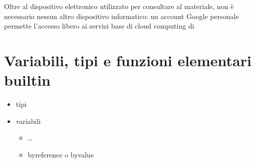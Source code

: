\documentclass[letterpaper,10pt,italian]{jupyterBook}
\begin{document}
\sphinxAtStartPar
Oltre al dispositivo elettronico utilizzato per consultare al materiale, non è necessario nessun altro dispositivo informatico: un account Google personale permette l’accesso libero ai servizi base di cloud computing di 

\sphinxstepscope


\chapter{Variabili, tipi e funzioni elementari built\sphinxhyphen{}in}
\label{\detokenize{ch/programming/types:variabili-tipi-e-funzioni-elementari-built-in}}\label{\detokenize{ch/programming/types::doc}}\begin{itemize}
\item {} 
\sphinxAtStartPar
tipi

\item {} 
\sphinxAtStartPar
variabili
\begin{itemize}
\item {} 
\sphinxAtStartPar
…

\item {} 
\sphinxAtStartPar
by\sphinxhyphen{}reference o by\sphinxhyphen{}value

\end{itemize}

\end{itemize}
\end{document}
